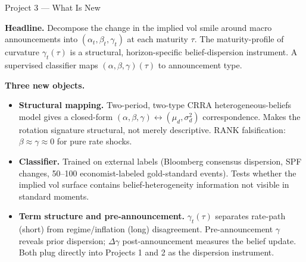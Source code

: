 \documentclass[aspectratio=169, 11pt]{beamer}
\newenvironment{citemize}{\begin{itemize}\setlength{\itemsep}{2pt}\setlength{\parskip}{0pt}}{\end{itemize}}
\newcommand{\contribbox}[1]{%
  \begin{tcolorbox}[colback=accentgreen!10,colframe=accentgreen,boxrule=0.8pt,arc=2pt,left=4pt,right=4pt,top=2pt,bottom=2pt]
    #1\end{tcolorbox}}
\begin{document}
\begin{frame}{Project 3 --- What Is New}
\small
\contribbox{\textbf{Headline.} Decompose the change in the implied vol smile around macro announcements into $(\alpha_t,\beta_t,\gamma_t)$ at each maturity $\tau$. The maturity-profile of curvature $\gamma_t(\tau)$ is a structural, horizon-specific belief-dispersion instrument. A supervised classifier maps $(\alpha,\beta,\gamma)(\tau)$ to announcement type.}

\vspace{0.2cm}
\textbf{Three new objects.}
\begin{citemize}
  \item \textbf{Structural mapping.} Two-period, two-type CRRA heterogeneous-beliefs model gives a closed-form $(\alpha,\beta,\gamma) \leftrightarrow (\mu_d,\sigma_d^2)$ correspondence. Makes the rotation signature structural, not merely descriptive. RANK falsification: $\beta\approx\gamma\approx 0$ for pure rate shocks.
  \item \textbf{Classifier.} Trained on external labels (Bloomberg consensus dispersion, SPF changes, 50--100 economist-labeled gold-standard events). Tests whether the implied vol surface contains belief-heterogeneity information not visible in standard moments.
  \item \textbf{Term structure and pre-announcement.} $\gamma_t(\tau)$ separates rate-path (short) from regime/inflation (long) disagreement. Pre-announcement $\gamma$ reveals prior dispersion; $\Delta\gamma$ post-announcement measures the belief update. Both plug directly into Projects 1 and 2 as the dispersion instrument.
\end{citemize}
\end{frame}
\end{document}
